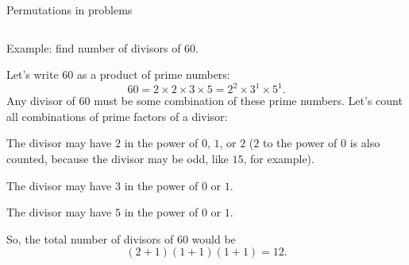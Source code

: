 \documentclass[9pt,aspectratio=169]{beamer}
\begin{document}
\begin{frame}{Permutations in problems}
\begin{columns}[T]
\begin{column}{0.5\textwidth}
      \begin{problem}
        {\color{textBlue} Example:} find number of divisors of $60$.
      \end{problem}

      {\small
      Let’s write $60$ as a product of prime numbers:
      \[ 60 = 2 \times 2 \times 3 \times 5 = 2^2 \times 3^1 \times 5^1.\]
      Any divisor of $60$ must be some combination of these prime numbers. Let’s count all combinations of prime factors of a divisor:

      The divisor may have $2$ in the power of $0$, $1$, or $2$ ($2$ to the power of $0$ is also counted, because the divisor may be odd, like $15$, for example).

      The divisor may have $3$ in the power of $0$ or $1$.

      The divisor may have $5$ in the power of $0$ or $1$.

      So, the total number of divisors of $60$ would be
      \[(2 + 1) (1 + 1) (1 + 1) = 12.\]
      }
    \end{column}
  \end{columns}
\end{frame}
\end{document}
